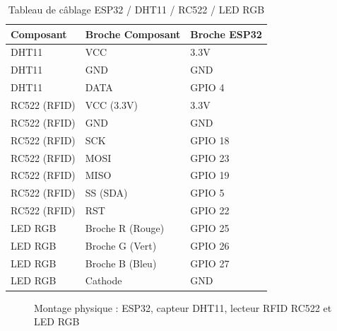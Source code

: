 \documentclass[12pt,a4paper]{report}
\begin{document}
\begin{table}[h!]
    \centering
    \begin{tabular}{|l|l|l|}
        \hline
        \textbf{Composant} & \textbf{Broche Composant} & \textbf{Broche ESP32} \\
        \hline
        DHT11 & VCC & 3.3V \\
        DHT11 & GND & GND \\
        DHT11 & DATA & GPIO 4 \\
        \hline
        RC522 (RFID) & VCC (3.3V) & 3.3V \\
        RC522 (RFID) & GND & GND \\
        RC522 (RFID) & SCK & GPIO 18 \\
        RC522 (RFID) & MOSI & GPIO 23 \\
        RC522 (RFID) & MISO & GPIO 19 \\
        RC522 (RFID) & SS (SDA) & GPIO 5 \\
        RC522 (RFID) & RST & GPIO 22 \\
        \hline
        LED RGB & Broche R (Rouge) & GPIO 25 \\
        LED RGB & Broche G (Vert) & GPIO 26 \\
        LED RGB & Broche B (Bleu) & GPIO 27 \\
        LED RGB & Cathode & GND \\
        \hline
    \end{tabular}
    \caption{Tableau de câblage ESP32 / DHT11 / RC522 / LED RGB}
\end{table}

\begin{figure}[h]
    \centering
    \caption{Montage physique : ESP32, capteur DHT11, lecteur RFID RC522 et LED RGB}
\end{figure}
\end{document}
